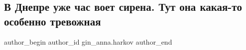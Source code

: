  
 
 
 
 
 
\subsection{В Днепре уже час воет сирена. Тут она какая-то особенно тревожная}
\label{sec:07_04_2022.fb.gin_anna.harkov.1.dnepr_sirena}
 
\ifcmt
 author_begin
   author_id gin_anna.harkov
 author_end
\fi
